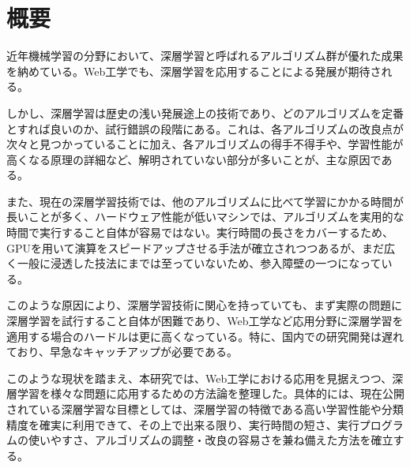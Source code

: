 \chapter*{概要}
近年機械学習の分野において、深層学習と呼ばれるアルゴリズム群が優れた成果を納めている。Web工学でも、深層学習を応用することによる発展が期待される。\par
しかし、深層学習は歴史の浅い発展途上の技術であり、どのアルゴリズムを定番とすれば良いのか、試行錯誤の段階にある。これは、各アルゴリズムの改良点が次々と見つかっていることに加え、各アルゴリズムの得手不得手や、学習性能が高くなる原理の詳細など、解明されていない部分が多いことが、主な原因である。\par
また、現在の深層学習技術では、他のアルゴリズムに比べて学習にかかる時間が長いことが多く、ハードウェア性能が低いマシンでは、アルゴリズムを実用的な時間で実行すること自体が容易ではない。実行時間の長さをカバーするため、GPUを用いて演算をスピードアップさせる手法が確立されつつあるが、まだ広く一般に浸透した技法にまでは至っていないため、参入障壁の一つになっている。\par
このような原因により、深層学習技術に関心を持っていても、まず実際の問題に深層学習を試行すること自体が困難であり、Web工学など応用分野に深層学習を適用する場合のハードルは更に高くなっている。特に、国内での研究開発は遅れており、早急なキャッチアップが必要である。\par
このような現状を踏まえ、本研究では、Web工学における応用を見据えつつ、深層学習を様々な問題に応用するための方法論を整理した。具体的には、現在公開されている深層学習な目標としては、深層学習の特徴である高い学習性能や分類精度を確実に利用できて、その上で出来る限り、実行時間の短さ、実行プログラムの使いやすさ、アルゴリズムの調整・改良の容易さを兼ね備えた方法を確立する。

\begin{comment}このような原因により、深層学習技術に関心を持っていても、まず実際の問題に深層学習を試行すること自体が困難であり、応用技術開発のハードルは更に高くなっている。アルゴリズムが開発途上で確定できていないため、公開されているライブラリも、現状では、開発用途や実験的なものが多くなってしまっている。そもそも有力なアルゴリズムに対応する実装が用意されていない場合や、問題に応じて自らアルゴリズムの細部を調整しなければならない場合もある。ライブラリがGPU専用に書かれていることが徒となり、GPUを持っていないと実行自体ができなくなることも考えられる。例え実行するところまで到達できたとしても、提供されているのがアルゴリズムのダイジェスト版でしかなく、論文にて示されている精度を手元で再現することが出来ない場合も多い。標準と言える公開ライブラリが確立していない状況なので、Web工学など応用分野に深層学習を適用したいと考えても、プログラム開発に長い時間がかかってしまい、開発における大きな障壁となっている。特に、国内での研究開発は遅れており、早急なキャッチアップが必要である。
\end{comment}
